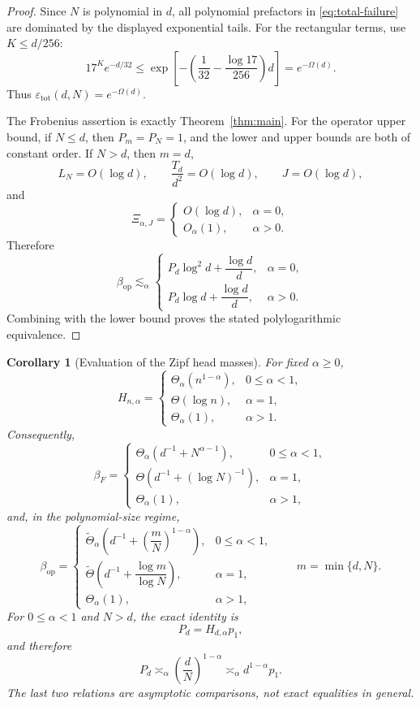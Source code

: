 \documentclass[11pt]{article}
\newtheorem{corollary}[theorem]{Corollary}
\newcommand{\1}{\mathbf{1}}
\newcommand{\op}{\mathrm{op}}
\begin{document}
\begin{proof}
Since \(N\) is polynomial in \(d\), all polynomial prefactors in
\eqref{eq:total-failure} are dominated by the displayed exponential tails.
For the rectangular terms, use \(K\le d/256\):
\[
 17^K e^{-d/32}
 \le
 \exp\left[-\left(\frac1{32}-\frac{\log17}{256}\right)d\right]
 =e^{-\Omega(d)}.
\]
Thus \(\varepsilon_{\mathrm{tot}}(d,N)=e^{-\Omega(d)}\).

The Frobenius assertion is exactly Theorem~\ref{thm:main}.  For the operator
upper bound, if \(N\le d\), then \(P_m=P_N=1\), and the lower and upper bounds
are both of constant order.  If \(N>d\), then \(m=d\),
\[
 L_N=O(\log d),
 \qquad
 \frac{T_d}{d^2}=O(\log d),
 \qquad
 J=O(\log d),
\]
and
\[
 \Xi_{\alpha,J}
 =
 \begin{cases}
 O(\log d),&\alpha=0,\\
 O_\alpha(1),&\alpha>0.
 \end{cases}
\]
Therefore
\[
 \beta_{\op}
 \lesssim_\alpha
 \begin{cases}
 P_d\log^2d+\dfrac{\log d}{d},&\alpha=0,\\[2mm]
 P_d\log d+\dfrac{\log d}{d},&\alpha>0.
 \end{cases}
\]
Combining with the lower bound proves the stated polylogarithmic equivalence.
\end{proof}

\begin{corollary}[Evaluation of the Zipf head masses]
\label{cor:zipf-evaluation}
For fixed \(\alpha\ge0\),
\[
 H_{n,\alpha}
 =
 \begin{cases}
 \Theta_\alpha(n^{1-\alpha}),&0\le\alpha<1,\\
 \Theta(\log n),&\alpha=1,\\
 \Theta_\alpha(1),&\alpha>1.
 \end{cases}
\]
Consequently,
\[
 \beta_F
 =
 \begin{cases}
 \Theta_\alpha\!\left(d^{-1}+N^{\alpha-1}\right),&0\le\alpha<1,\\[1mm]
 \Theta\!\left(d^{-1}+(\log N)^{-1}\right),&\alpha=1,\\[1mm]
 \Theta_\alpha(1),&\alpha>1,
 \end{cases}
\]
and, in the polynomial-size regime,
\[
 \beta_{\op}
 =
 \begin{cases}
 \widetilde\Theta_\alpha\!\left(
 d^{-1}+\left(\dfrac{m}{N}\right)^{1-\alpha}
 \right),&0\le\alpha<1,\\[4mm]
 \widetilde\Theta\!\left(
 d^{-1}+\dfrac{\log m}{\log N}
 \right),&\alpha=1,\\[4mm]
 \Theta_\alpha(1),&\alpha>1,
 \end{cases}
 \qquad m=\min\{d,N\}.
\]
For \(0\le\alpha<1\) and \(N>d\), the exact identity is
\[
 P_d=H_{d,\alpha}p_1,
\]
and therefore
\[
 P_d
 \asymp_\alpha
 \left(\frac dN\right)^{1-\alpha}
 \asymp_\alpha
 d^{1-\alpha}p_1.
\]
The last two relations are asymptotic comparisons, not exact equalities in
general.
\end{corollary}
\end{document}
